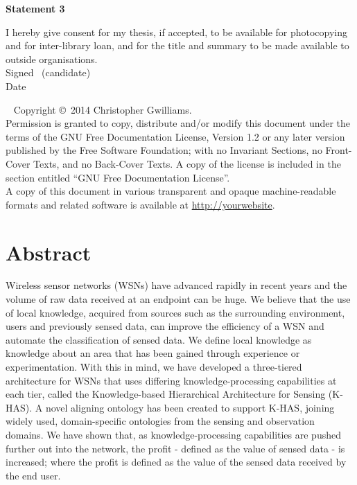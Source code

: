 \documentclass[a4paper,oneside,onecolumn,openright,12pt]{book}
\def\baselinestretch{1.5}
\begin{document}
\vfill

\textbf{\large Statement 3}

I hereby give consent for my thesis, if accepted, to be available for photocopying and for inter-library loan,
 and for the title and summary to be made available to outside organisations.\\[2ex]
Signed \dotfill \ (candidate) \hspace*{10em}\\[1ex]
Date\ \ \ \ \ \dotfill \hspace*{18em}

\vfill

\cleardoublepage

\thispagestyle{plain}
\ \vfill{\small
Copyright \copyright\ 2014 Christopher Gwilliams.\\
Permission is granted to copy, distribute and/or modify this document
under the terms of the GNU Free Documentation License, Version 1.2 or
any later version published by the Free Software Foundation; with no
Invariant Sections, no Front-Cover Texts, and no Back-Cover Texts. A
copy of the license is included in the section entitled ``GNU Free
Documentation License''.}\\[3.5ex]
A copy of this document in various transparent and opaque
machine-readable formats and related software is available at
\url{http://yourwebsite}.
\cleardoublepage




\chapter*{Abstract}


\def\baselinestretch{1.5}\normalfont

Wireless sensor networks (WSNs) have advanced rapidly in recent years and the volume of raw data received at an endpoint can be huge. We believe that the use of local knowledge, acquired from sources such as the surrounding environment, users and previously sensed data, can improve the efficiency of a WSN and automate the classification of sensed data. We define local knowledge as knowledge about an area that has been gained through experience or experimentation. With this in mind, we have developed a three-tiered architecture for WSNs that uses differing knowledge-processing capabilities at each tier, called the Knowledge-based Hierarchical Architecture for Sensing (K-HAS). A novel aligning ontology has been created to support K-HAS, joining widely used, domain-specific ontologies from the sensing and observation domains. We have shown that, as knowledge-processing capabilities are pushed further out into the network, the profit - defined as the value of sensed data - is increased; where the profit is defined as the value of the sensed data received by the end user.
\end{document}
